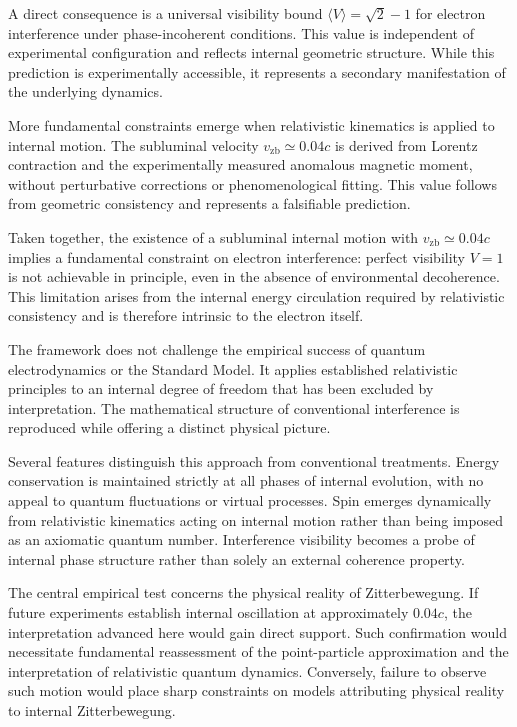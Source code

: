 \documentclass[%
 reprint,
 amsmath,amssymb,
 aps,
 prb,
]{revtex4-2}
\numberwithin{equation}{section}
\begin{document}
A direct consequence is a universal visibility bound $\langle V \rangle = \sqrt{2} - 1$ for electron interference under phase-incoherent conditions. This value is independent of experimental configuration and reflects internal geometric structure. While this prediction is experimentally accessible, it represents a secondary manifestation of the underlying dynamics.

More fundamental constraints emerge when relativistic kinematics is applied to internal motion. The subluminal velocity $v_{\mathrm{zb}} \simeq 0.04c$ is derived from Lorentz contraction and the experimentally measured anomalous magnetic moment, without perturbative corrections or phenomenological fitting. This value follows from geometric consistency and represents a falsifiable prediction.

Taken together, the existence of a subluminal internal motion with $v_{\mathrm{zb}} \simeq 0.04c$ implies a fundamental constraint on electron interference: perfect visibility $V=1$ is not achievable in principle, even in the absence of environmental decoherence. This limitation arises from the internal energy circulation required by relativistic consistency and is therefore intrinsic to the electron itself.

The framework does not challenge the empirical success of quantum electrodynamics or the Standard Model. It applies established relativistic principles to an internal degree of freedom that has been excluded by interpretation. The mathematical structure of conventional interference is reproduced while offering a distinct physical picture.

Several features distinguish this approach from conventional treatments. Energy conservation is maintained strictly at all phases of internal evolution, with no appeal to quantum fluctuations or virtual processes. Spin emerges dynamically from relativistic kinematics acting on internal motion rather than being imposed as an axiomatic quantum number. Interference visibility becomes a probe of internal phase structure rather than solely an external coherence property.

The central empirical test concerns the physical reality of Zitterbewegung. If future experiments establish internal oscillation at approximately $0.04c$, the interpretation advanced here would gain direct support. Such confirmation would necessitate fundamental reassessment of the point-particle approximation and the interpretation of relativistic quantum dynamics. Conversely, failure to observe such motion would place sharp constraints on models attributing physical reality to internal Zitterbewegung.
\end{document}
